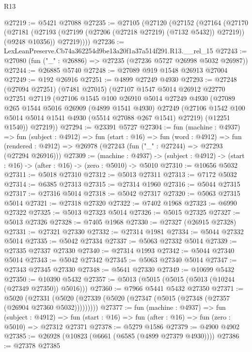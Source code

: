 \begin{lexlean}{R13}
\begin{coremodule}
@27219 := @5421 @27088
@27235 := @27105
    (@27120
      (@27152
        (@27164
          (@27170
            (@27181 (@27193 (@27199 (@27206 (@27218 @27219) (@7132 @5432)) @27219)) (@9248 @10356))
            @27219))))
@27236 := LexLeanPreserve.Cb74a362254d9be13a20f1a37a514f291.R13.__rel_15
@27243 := @27080 (fun ("_" : @26886) => @27235 (@27236 @5727 @26998 @5032 @26987))
@27244 := @26885 @5740
@27248 := @27089 @919 @1548 @26913 @27004
@27249 := @192 @26916
@27251 := @4899 @27249 @4930
@27293 := @27248
    (@27094 @27251)
    (@7481 @27015)
    (@27107
      @1547
      @5014
      @26912
      @22770
      @27251
      @27119
      (@27106
        @1545
        @100
        @26910
        @5014
        @27249
        @4930
        (@27089
          @265
          @1544
          @5016
          @26909
          (@4899 @1541 @4930)
          @27249
          (@27106 @1542 @100 @5014 @5014 @1541 @4930 (@5514 @27088 @267 @1541) @27219)
          (@12251 @1540))
        @27219))
@27294 := @23391 @5727
@27304 := fun (machine : @4937) =>
  fun (subject : @4912) =>
  fun (start : @16) =>
  fun (word : @4912) =>
  fun (rendered : @4912) => @26978 (@27243 (fun ("_" : @27244) => @27293 (@27294 @26916)))
@27309 := (machine : @4937) ->
  (subject : @4912) -> (start : @16) -> (after : @16) -> (zero : @5010) -> @5010
@27310 := @10656 @5032
@27311 := @5018 @27310
@27312 := @5013 @27311
@27313 := @7172 @5032
@27314 := @6385 @27313
@27315 := @27314 @1960
@27316 := @5044 @27315
@27317 := @27316 @5014
@27318 := @5042 @27317
@27320 := @5063 @27315 @5014
@27321 := @27318 @27320
@27322 := @7402 @1968
@27323 := @6990 @27322
@27325 := @5013 @27323 @5014
@27326 := @5015 @27325
@27327 := @5013 @27326
@27328 := @7405 @1968
@27330 := @27327 (@26915 @27328)
@27331 := @27321 @27330
@27332 := @27314 @1981
@27334 := @5044 @27332 @5014
@27335 := @5042 @27334
@27337 := @5063 @27332 @5014
@27339 := @27335 @27337 @27330
@27340 := @27314 @1993
@27342 := @5044 @27340 @5014
@27343 := @5042 @27342
@27345 := @5063 @27340 @5014
@27347 := @27343 @27345 @27330
@27348 := @5641 @27330
@27349 := @10699 @5432
@27350 := @10390 @5432
@27357 := @5013 (@5015 (@5015 (@5013 (@10244 (@27349 @27350)) @5016)))
@27360 := @7966 @5441 @5432 @27350
@27371 := @5020
    (@27331 (@5020 (@27339 (@5020 (@27347 (@5015 (@27348 (@27357 (@26904 @27360 @5032)))))))))
@27377 := fun (machine : @4937) =>
  fun (subject : @4912) =>
  fun (start : @16) => fun (after : @16) => fun (zero : @5010) => @27312 @27371
@27378 := @5279 @1586
@27379 := @4900 @4902
@27385 := @26928 (@10823 (@6661 (@6585 (@4899 @27379 @4930))))
@27386 := @27378 @27385

\end{coremodule}
\end{lexlean}
